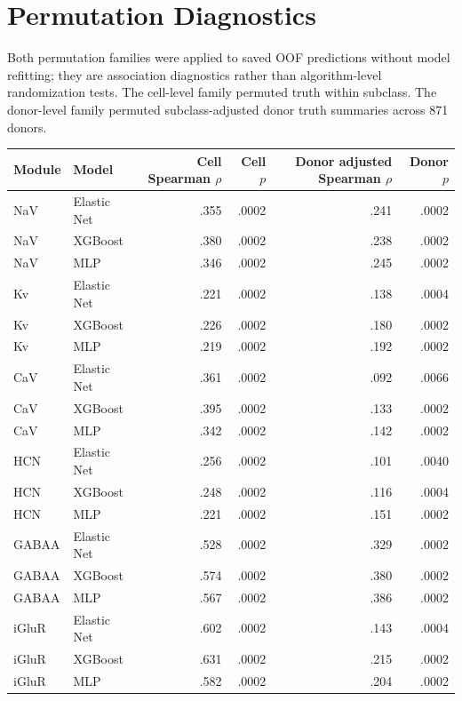 \documentclass[11pt]{article}
\newcommand{\tablefont}{\fontsize{9.5}{11.2}\selectfont}
\newcommand{\sourcecaption}[1]{\Needspace{10\baselineskip}\vspace{2pt}{\small\bfseries #1}\par\vspace{2pt}}
\begin{document}
\section{Permutation Diagnostics}
Both permutation families were applied to saved OOF predictions without model refitting; they are association diagnostics rather than algorithm-level randomization tests. The cell-level family permuted truth within subclass. The donor-level family permuted subclass-adjusted donor truth summaries across 871 donors.

\sourcecaption{Permutation diagnostics based on saved OOF predictions, without model refitting (Table S16; 5,000 permutations).}
\begin{center}\tablefont
\begin{tabular}{llrrrr}
\toprule
Module & Model & Cell Spearman $\rho$ & Cell $p$ & Donor adjusted Spearman $\rho$ & Donor $p$ \\
\midrule
NaV & Elastic Net & .355 & .0002 & .241 & .0002 \\
NaV & XGBoost & .380 & .0002 & .238 & .0002 \\
NaV & MLP & .346 & .0002 & .245 & .0002 \\
Kv & Elastic Net & .221 & .0002 & .138 & .0004 \\
Kv & XGBoost & .226 & .0002 & .180 & .0002 \\
Kv & MLP & .219 & .0002 & .192 & .0002 \\
CaV & Elastic Net & .361 & .0002 & .092 & .0066 \\
CaV & XGBoost & .395 & .0002 & .133 & .0002 \\
CaV & MLP & .342 & .0002 & .142 & .0002 \\
HCN & Elastic Net & .256 & .0002 & .101 & .0040 \\
HCN & XGBoost & .248 & .0002 & .116 & .0004 \\
HCN & MLP & .221 & .0002 & .151 & .0002 \\
GABAA & Elastic Net & .528 & .0002 & .329 & .0002 \\
GABAA & XGBoost & .574 & .0002 & .380 & .0002 \\
GABAA & MLP & .567 & .0002 & .386 & .0002 \\
iGluR & Elastic Net & .602 & .0002 & .143 & .0004 \\
iGluR & XGBoost & .631 & .0002 & .215 & .0002 \\
iGluR & MLP & .582 & .0002 & .204 & .0002 \\
\bottomrule
\end{tabular}
\end{center}
\end{document}
